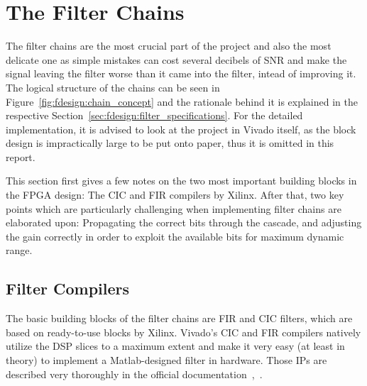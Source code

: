 \section{The Filter Chains} %
\label{sec:fpga:chains}
%
%
The filter chains are  the most crucial part of the project  and also the most
delicate  one  as  simple  mistakes  can cost  several  decibels  of  SNR  and
make  the signal  leaving  the filter  worse  than it  came  into the  filter,
intead  of improving  it.  The  logical structure  of the  chains can  be seen
in  Figure~\ref{fig:fdesign:chain_concept}  and  the rationale  behind  it  is
explained  in the  respective Section~\ref{sec:fdesign:filter_specifications}.
For the  detailed implementation,  it is  advised to look  at the  project in
Vivado  itself, as  the block  design is  impractically large  to be  put onto
paper, thus it is omitted in this report.

This section first gives a few notes on the two most important building blocks
in the FPGA design: The CIC and FIR  compilers by Xilinx.  After that, two key
points which are particularly challenging  when implementing filter chains are
elaborated  upon: Propagating  the  correct  bits  through  the  cascade,  and
adjusting  the gain  correctly  in order  to exploit  the  available bits  for
maximum dynamic range.

%
%
\subsection{Filter Compilers} %
\label{subsec:fpga:filter_compilers}

The  basic building  blocks of  the  filter chains  are FIR  and CIC  filters,
which  are  based on  ready-to-use  blocks  by  Xilinx. Vivado's CIC  and  FIR
compilers natively  utilize the  DSP slices  to a maximum  extent and  make it
very  easy  (at  least  in  theory)  to  implement  a  Matlab-designed  filter
in  hardware. Those  IPs  are  described   very  thoroughly  in  the  official
documentation~\cite{xilinx:fir-compiler},~\cite{xilinx:cic-compiler}.

